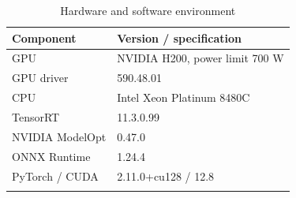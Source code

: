 \begin{table}[htbp]
\caption{Hardware and software environment}\label{tab:hardware}
\begin{tabular}{@{}ll@{}}
\toprule
Component & Version / specification \\
\midrule
GPU & NVIDIA H200, power limit 700 W \\
GPU driver & 590.48.01 \\
CPU & Intel Xeon Platinum 8480C \\
TensorRT & 11.3.0.99 \\
NVIDIA ModelOpt & 0.47.0 \\
ONNX Runtime & 1.24.4 \\
PyTorch / CUDA & 2.11.0+cu128 / 12.8 \\
\botrule
\end{tabular}
\end{table}
